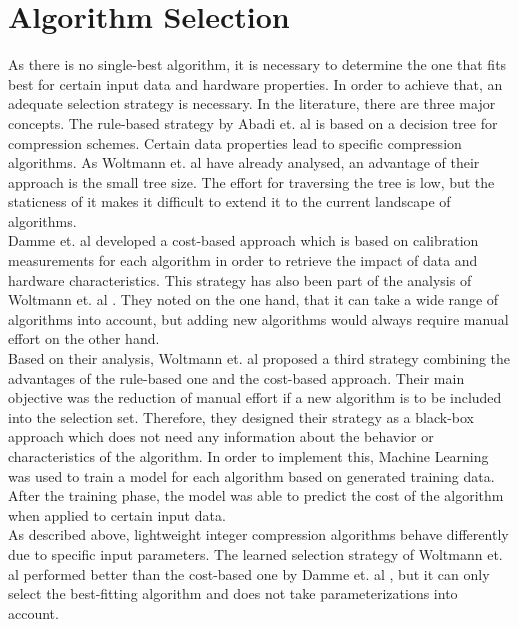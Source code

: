 \section{Algorithm Selection}
As there is no single-best algorithm, it is necessary to determine the one that fits best for certain input data and hardware properties. In order to achieve that, an adequate selection strategy is necessary. 
In the literature, there are three major concepts. The rule-based strategy by Abadi et. al \cite{Abadi2006} is based on a decision tree for compression schemes. Certain data properties lead to specific compression algorithms. As Woltmann et. al \cite{Woltmann2021} have already analysed, an advantage of their approach is the small tree size. The effort for traversing the tree is low, but the staticness of it makes it difficult to extend it to the current landscape of algorithms.\\
Damme et. al \cite{Damme2019} developed a cost-based approach which is based on calibration measurements for each algorithm in order to retrieve the impact of data and hardware characteristics. This strategy has also been part of the analysis of Woltmann et. al \cite{Woltmann2021}. They noted on the one hand, that it can take a wide range of algorithms into account, but adding new algorithms would always require manual effort on the other hand.\\
Based on their analysis, Woltmann et. al \cite{Woltmann2021} proposed a third strategy combining the advantages of the rule-based one and the cost-based approach. Their main objective was the reduction of manual effort if a new algorithm is to be included into the selection set. Therefore, they designed their strategy as a black-box approach which does not need any information about the behavior or characteristics of the algorithm. In order to implement this, Machine Learning was used to train a model for each algorithm based on generated training data. After the training phase, the model was able to predict the cost of the algorithm when applied to certain input data.\\
As described above, lightweight integer compression algorithms behave differently due to specific input parameters. The learned selection strategy of Woltmann et. al \cite{Woltmann2021} performed better than the cost-based one by Damme et. al \cite{Damme2019}, but it can only select the best-fitting algorithm and does not take parameterizations into account.

